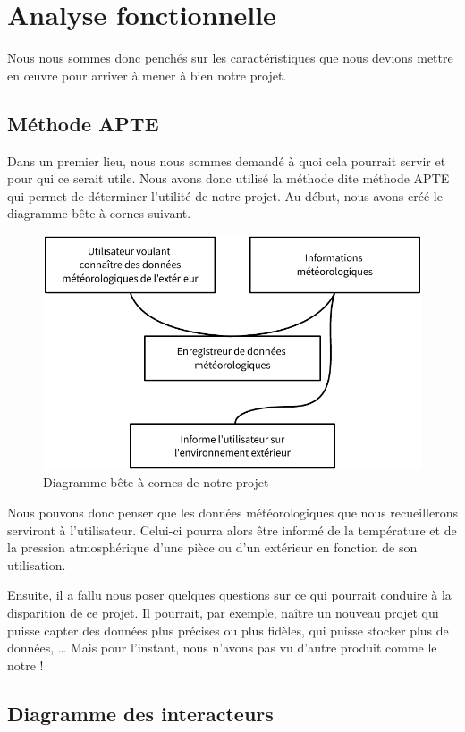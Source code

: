 \section{Analyse fonctionnelle}

Nous nous sommes donc penchés sur les caractéristiques que nous devions mettre en œuvre pour arriver à mener à bien notre projet.

\subsection{Méthode APTE}

Dans un premier lieu, nous nous sommes demandé à quoi cela pourrait servir et pour qui ce serait utile. Nous avons donc utilisé la méthode dite \og méthode APTE \fg{} qui permet de déterminer l'utilité de notre projet. Au début, nous avons créé le diagramme bête à cornes suivant.

\begin{figure}[!h]
	\centering
	\includegraphics[width=.6\linewidth]{Images/Diagramme_APTE}
	\caption{Diagramme bête à cornes de notre projet}
\end{figure}

Nous pouvons donc penser que les données météorologiques que nous recueillerons serviront à l'utilisateur. Celui-ci pourra alors être informé de la température et de la pression atmosphérique d'une pièce ou d'un extérieur en fonction de son utilisation.

Ensuite, il a fallu nous poser quelques questions sur ce qui pourrait conduire à la disparition de ce projet. Il pourrait, par exemple, naître un nouveau projet qui puisse capter des données plus précises ou plus fidèles, qui puisse stocker plus de données, \dots{} Mais pour l'instant, nous n'avons pas vu d'autre produit comme le notre !

\subsection{Diagramme des interacteurs}

